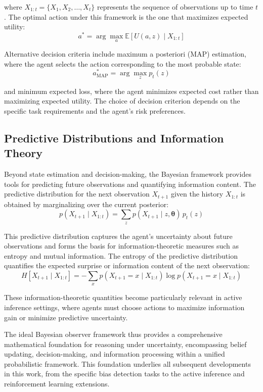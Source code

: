 \documentclass{article}
\begin{document}
where $X_{1:t} = \{X_1, X_2, \ldots, X_t\}$ represents the sequence of observations up to time $t$. The optimal action under this framework is the one that maximizes expected utility:
\begin{equation}
a^* = \arg\max_a \mathbb{E}[U(a, z) \mid X_{1:t}]
\end{equation}

Alternative decision criteria include maximum a posteriori (MAP) estimation, where the agent selects the action corresponding to the most probable state:
\begin{equation}
a^*_{\text{MAP}} = \arg\max_z p_t(z)
\end{equation}

and minimum expected loss, where the agent minimizes expected cost rather than maximizing expected utility. The choice of decision criterion depends on the specific task requirements and the agent's risk preferences.

\subsection{Predictive Distributions and Information Theory}

Beyond state estimation and decision-making, the Bayesian framework provides tools for predicting future observations and quantifying information content. The predictive distribution for the next observation $X_{t+1}$ given the history $X_{1:t}$ is obtained by marginalizing over the current posterior:
\begin{equation}
p(X_{t+1} \mid X_{1:t}) = \sum_z p(X_{t+1} \mid z, \boldsymbol{\theta}) \, p_t(z)
\end{equation}

This predictive distribution captures the agent's uncertainty about future observations and forms the basis for information-theoretic measures such as entropy and mutual information. The entropy of the predictive distribution quantifies the expected surprise or information content of the next observation:
\begin{equation}
H[X_{t+1} \mid X_{1:t}] = -\sum_{x} p(X_{t+1} = x \mid X_{1:t}) \log p(X_{t+1} = x \mid X_{1:t})
\end{equation}

These information-theoretic quantities become particularly relevant in active inference settings, where agents must choose actions to maximize information gain or minimize predictive uncertainty.

The ideal Bayesian observer framework thus provides a comprehensive mathematical foundation for reasoning under uncertainty, encompassing belief updating, decision-making, and information processing within a unified probabilistic framework. This foundation underlies all subsequent developments in this work, from the specific bias detection tasks to the active inference and reinforcement learning extensions.
\end{document}
